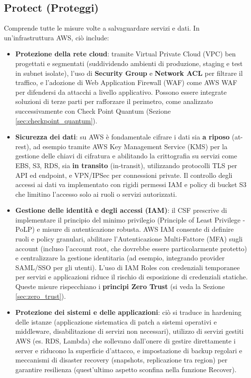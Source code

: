 \subsection{Protect (Proteggi)}
\label{subsec:nist_csf_protect}
Comprende tutte le misure volte a salvaguardare servizi e dati. In un'infrastruttura AWS, ciò include:
\begin{itemize}
    \item \textbf{Protezione della rete cloud}: tramite Virtual Private Cloud (VPC) ben progettati e segmentati (suddividendo ambienti di produzione, staging e test in subnet isolate), l'uso di \textbf{Security Group} e \textbf{Network ACL} per filtrare il traffico, e l'adozione di Web Application Firewall (WAF) come AWS WAF per difendersi da attacchi a livello applicativo. Possono essere integrate soluzioni di terze parti per rafforzare il perimetro, come analizzato successivamente con Check Point Quantum (Sezione \ref{sec:checkpoint_quantum}).
    \item \textbf{Sicurezza dei dati}: su AWS è fondamentale cifrare i dati sia \textbf{a riposo} (at-rest), ad esempio tramite AWS Key Management Service (KMS) per la gestione delle chiavi di cifratura e abilitando la crittografia su servizi come EBS, S3, RDS, sia \textbf{in transito} (in-transit), utilizzando protocolli TLS per API ed endpoint, e VPN/IPSec per connessioni private. Il controllo degli accessi ai dati va implementato con rigidi permessi IAM e policy di bucket S3 che limitino l'accesso solo ai ruoli o servizi autorizzati.
    \item \textbf{Gestione delle identità e degli accessi (IAM)}: il CSF prescrive di implementare il principio del minimo privilegio (Principle of Least Privilege - PoLP) e misure di autenticazione robusta. AWS IAM consente di definire ruoli e policy granulari, abilitare l'Autenticazione Multi-Fattore (MFA) sugli account (incluso l'account root, che dovrebbe essere particolarmente protetto) e centralizzare la gestione identitaria (ad esempio, integrando provider SAML/SSO per gli utenti). L'uso di IAM Roles con credenziali temporanee per servizi e applicazioni riduce il rischio di esposizione di credenziali statiche. Queste misure rispecchiano i \textbf{principi Zero Trust} (si veda la Sezione \ref{sec:zero_trust}).
    \item \textbf{Protezione dei sistemi e delle applicazioni}: ciò si traduce in hardening delle istanze (applicazione sistematica di patch a sistemi operativi e middleware, disabilitazione di servizi non necessari), utilizzo di servizi gestiti AWS (es. RDS, Lambda) che sollevano dall'onere di gestire direttamente i server e riducono la superficie d'attacco, e impostazione di backup regolari e meccanismi di disaster recovery (snapshots, replicazione tra region) per garantire resilienza (quest'ultimo aspetto sconfina nella funzione Recover).
\end{itemize}

